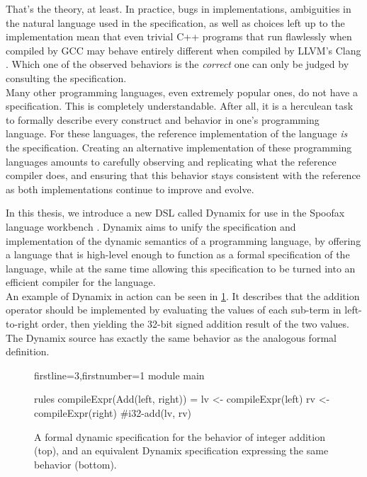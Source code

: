 That's the theory, at least. In practice, bugs in implementations, ambiguities in the natural language used in the specification, as well as choices left up to the implementation mean that even trivial C++ programs that run flawlessly when compiled by GCC \cite{gcc} may behave entirely different when compiled by LLVM's Clang \cite{clang}. Which one of the observed behaviors is the \textit{correct} one can only be judged by consulting the specification.\\

Many other programming languages, even extremely popular ones, do not have a specification. This is completely understandable. After all, it is a herculean task to formally describe every construct and behavior in one's programming language. For these languages, the reference implementation of the language \textit{is} the specification. Creating an alternative implementation of these programming languages amounts to carefully observing and replicating what the reference compiler does, and ensuring that this behavior stays consistent with the reference as both implementations continue to improve and evolve.\\



In this thesis, we introduce a new \ac{DSL} called Dynamix for use in the Spoofax language workbench \cite{Spoofax2021}. Dynamix aims to unify the specification and implementation of the dynamic semantics of a programming language, by offering a language that is high-level enough to function as a formal specification of the language, while at the same time allowing this specification to be turned into an efficient compiler for the language.\\

An example of Dynamix in action can be seen in \cref{fig:dynamix_addition}. It describes that the addition operator should be implemented by evaluating the values of each sub-term in left-to-right order, then yielding the 32-bit signed addition result of the two values. The Dynamix source has exactly the same behavior as the analogous formal definition.\\

\begin{figure}
  \begin{prooftree}
  \end{prooftree}
  \begin{dynamix*}{firstline=3,firstnumber=1}
module main

rules
  compileExpr(Add(left, right)) = {
    lv <- compileExpr(left)
    rv <- compileExpr(right)
    #i32-add(lv, rv)
  }
  \end{dynamix*}
  \caption{A formal dynamic specification for the behavior of integer addition (top), and an equivalent Dynamix specification expressing the same behavior (bottom).}
  \label{fig:dynamix_addition}
\end{figure}

